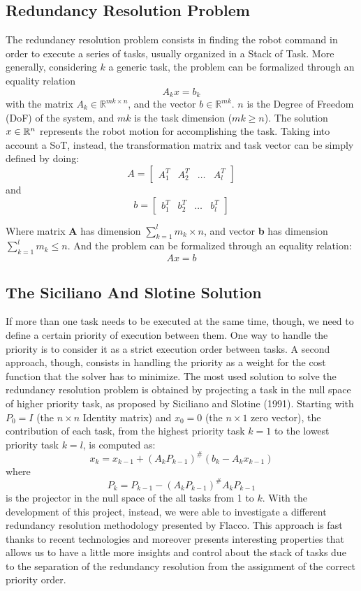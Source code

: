 \documentclass[12pt, a4paper]{article}
\newcommand{\R}{\mathbb{R}}
\begin{document}
\subsection{Redundancy Resolution Problem}
The redundancy resolution problem consists in finding the robot command in order to execute a series of tasks, usually organized in a Stack of Task.
More generally, considering $k$ a generic task, the problem can be formalized through an equality relation 
\begin{equation}
\label{stefano:1}
A_kx=b_k
\end{equation}
with the matrix $A_k \in \R^{mk \times n}$, and the vector $b \in \R^{mk}$. $n$ is the Degree of Freedom (DoF) of the system, and $mk$ is the task dimension ($mk \geq n$). The solution $x \in \Bbb R^n$ represents the robot motion for accomplishing the task.
Taking into account a SoT, instead, the transformation matrix and task vector can be simply defined by doing:
\[A=\begin{bmatrix}
A_1^T & A_2^T & \dots & A_l^T
\end{bmatrix}
\]
and
\[b=\begin{bmatrix}
b_1^T & b_2^T & \dots & b_l^T
\end{bmatrix}
\]

Where matrix \textbf{A} has dimension $\sum_{k=1}^l m_k \times n$, and vector \textbf{b} has dimension $\sum_{k=1}^l m_k \leq n$.
And the problem can be formalized through an equality relation: \[Ax = b\]

\subsection{The Siciliano And Slotine Solution}

If more than one task needs to be executed at the same time, though, we need to define a certain priority of execution between them. One way to handle the priority is  to consider it as a strict execution order between tasks. A second approach, though, consists in handling the priority as a weight for the cost function that the solver has to minimize.
The most used solution to solve the redundancy resolution problem is obtained by projecting a task in the null space of higher priority task, as proposed by Siciliano and Slotine (1991). Starting with $P_0 = I$ (the $n \times n$ Identity matrix) and $x_0 = 0$ (the $n \times 1$ zero vector), the contribution of each task, from the highest priority task $k = 1$ to the lowest priority task $k = l$, is computed as:
\[
x_k = x_{k-1} + (A_kP_{k-1})^{\#}(b_k - A_kx_{k-1})
\]where \[
P_k = P_{k-1}-(A_kP_{k-1})^{\#}A_kP_{k-1}
\]
is the projector in the null space of the all tasks from 1 to $k$.
With the development of this project, instead, we were able to investigate a different redundancy resolution methodology presented by Flacco. This approach is fast thanks to recent technologies and moreover presents interesting properties that allows us to have a little more insights and control about the stack of tasks due to the separation of the redundancy resolution from the assignment of the correct priority order. 
\end{document}
